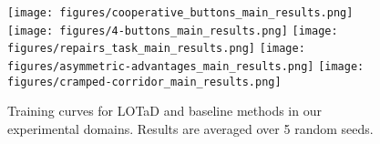 \begin{figure*}[t]
    \centering
    {
        \texttt{[image: figures/cooperative\_buttons\_main\_results.png]}
        \label{fig:cyrus_results}
    }
    {
        \texttt{[image: figures/4-buttons\_main\_results.png]}
        \label{fig:fig:challenge_results}
    }
    {
        \texttt{[image: figures/repairs\_task\_main\_results.png]}
        \label{fig:motivating_results}
    }
    {
        \texttt{[image: figures/asymmetric-advantages\_main\_results.png]}
        \label{fig:asymm_results}
    }
    {
        \texttt{[image: figures/cramped-corridor\_main\_results.png]}
        \label{fig:corridor_results}
    }
    \caption{Training curves for LOTaD and baseline methods in our experimental domains. Results are averaged over 5 random seeds.}
    \label{fig:combined_results}
\end{figure*}